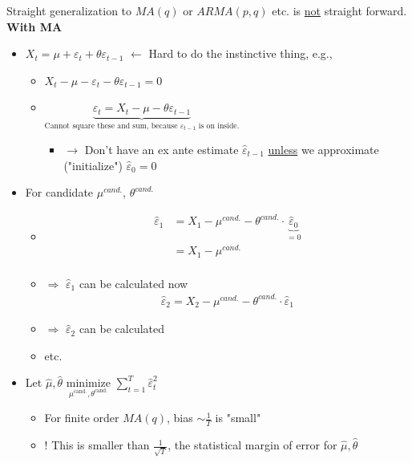 Straight generalization to $MA(q)$ or $ARMA(p,q)$ etc. is \underline{not} straight forward.\\

\textbf{With MA}
\begin{itemize}
    \item $X_t=\mu+\varepsilon_t+\theta\varepsilon_{t-1}$ $\leftarrow$ Hard to do the instinctive thing, e.g.,
    \begin{itemize}
        \item[] $X_t-\mu-\varepsilon_t-\theta\varepsilon_{t-1}=0$
        \item[] $\underbrace{\varepsilon_t=X_t-\mu-\theta\varepsilon_{t-1}}_\text{Cannot square these and sum, because $\varepsilon_{t-1}$ is on inside.}$
        \begin{itemize}
            \item[] $\rightarrow$ Don't have an ex ante estimate $\hat{\varepsilon}_{t-1}$ \underline{unless} we approximate ("initialize") $\hat{\varepsilon}_0=0$
        \end{itemize}
    \end{itemize}
    \item For candidate $\mu^{\textit{cand.}}$, $\theta^{\textit{cand.}}$
    \begin{itemize}
        \item[]
        \begin{align*}
            \hat{\varepsilon}_1&=X_1-\mu^{\textit{cand.}}-\theta^{\textit{cand.}}\cdot \underbrace{\hat{\varepsilon}_0}_{=0}\\
            &=X_1-\mu^{\textit{cand.}}\\
        \end{align*}
        \item[]$\Rightarrow$ $\hat{\varepsilon}_1$ can be calculated now
        \begin{align*}
            \hat{\varepsilon}_2=X_2-\mu^{\textit{cand.}}-\theta^{\textit{cand.}} \cdot \hat{\varepsilon}_1
        \end{align*}
        \item[]$\Rightarrow$ $\hat{\varepsilon}_2$ can be calculated 
        \item[] etc.
    \end{itemize}
    \item[] Let $\hat{\mu}, \hat{\theta}$ $\underset{\mu^{\text{cand.}},\theta^{\text{cand.}}}{\text{minimize}}$ $\sum_{t=1}^T \hat{\varepsilon}_t^2$
    \begin{itemize}
        \item[] For finite order $MA(q)$, bias $\sim \frac{1}{T}$ is "small"
        \item[] ! This is smaller than $\frac{1}{\sqrt{T}}$, the statistical margin of error for $\hat{\mu}, \hat{\theta}$
    \end{itemize}
\end{itemize}

